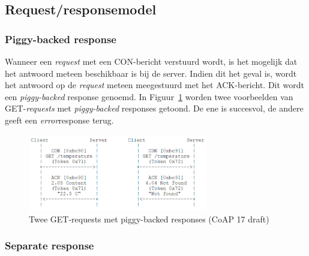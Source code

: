 \subsection{Request/responsemodel}

\subsubsection{Piggy-backed response}

Wanneer een \textit{request} met een CON-bericht verstuurd wordt, is het mogelijk dat het antwoord meteen beschikbaar is bij de server. Indien dit het geval is, wordt het antwoord op de \textit{request} meteen meegestuurd met het ACK-bericht. Dit wordt een \textit{piggy-backed} response genoemd. In Figuur~\ref{fig:CoAPPiggyBacked} worden twee voorbeelden van GET-\textit{requests} met \textit{piggy-backed} responses getoond. De ene is succesvol, de andere geeft een \textit{error}response terug.
\begin{figure}[h]
\vspace{10pt}
\centering
\includegraphics[width=0.7\textwidth]{fig/CoAPPiggyBacked}
\caption{Twee GET-requests met piggy-backed responses (CoAP 17 draft)}
\label{fig:CoAPPiggyBacked}
\end{figure}

\subsubsection{Separate response} \label{separate}

